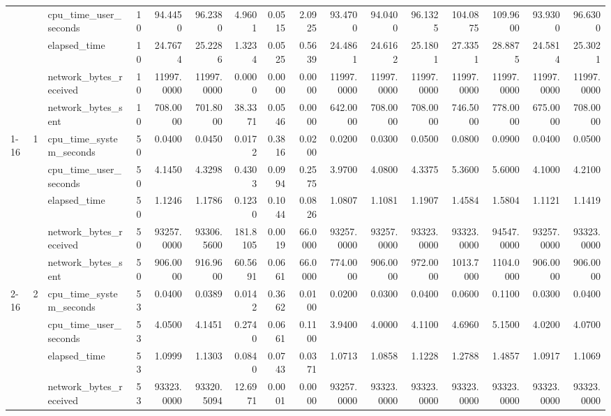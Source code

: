 \begin{tabular}{lllrrrrrrrrrrrrr}
 &  & cpu\_time\_user\_seconds & 10 & 94.4450 & 96.2380 & 4.9601 & 0.0515 & 2.0925 & 93.4700 & 94.0400 & 96.1325 & 104.0875 & 109.9600 & 93.9300 & 96.6300 \\
 &  & elapsed\_time & 10 & 24.7674 & 25.2286 & 1.3234 & 0.0525 & 0.5639 & 24.4861 & 24.6162 & 25.1801 & 27.3351 & 28.8875 & 24.5814 & 25.3021 \\
 &  & network\_bytes\_received & 10 & 11997.0000 & 11997.0000 & 0.0000 & 0.0000 & 0.0000 & 11997.0000 & 11997.0000 & 11997.0000 & 11997.0000 & 11997.0000 & 11997.0000 & 11997.0000 \\
 &  & network\_bytes\_sent & 10 & 708.0000 & 701.8000 & 38.3371 & 0.0546 & 0.0000 & 642.0000 & 708.0000 & 708.0000 & 746.5000 & 778.0000 & 675.0000 & 708.0000 \\
\cline{1-16} \cline{2-16}
\multirow[t]{15}{*}{bbox-filtering-duckdb-small} & \multirow[t]{5}{*}{1} & cpu\_time\_system\_seconds & 50 & 0.0400 & 0.0450 & 0.0172 & 0.3816 & 0.0200 & 0.0200 & 0.0300 & 0.0500 & 0.0800 & 0.0900 & 0.0400 & 0.0500 \\
 &  & cpu\_time\_user\_seconds & 50 & 4.1450 & 4.3298 & 0.4303 & 0.0994 & 0.2575 & 3.9700 & 4.0800 & 4.3375 & 5.3600 & 5.6000 & 4.1000 & 4.2100 \\
 &  & elapsed\_time & 50 & 1.1246 & 1.1786 & 0.1230 & 0.1044 & 0.0826 & 1.0807 & 1.1081 & 1.1907 & 1.4584 & 1.5804 & 1.1121 & 1.1419 \\
 &  & network\_bytes\_received & 50 & 93257.0000 & 93306.5600 & 181.8105 & 0.0019 & 66.0000 & 93257.0000 & 93257.0000 & 93323.0000 & 93323.0000 & 94547.0000 & 93257.0000 & 93323.0000 \\
 &  & network\_bytes\_sent & 50 & 906.0000 & 916.9600 & 60.5691 & 0.0661 & 66.0000 & 774.0000 & 906.0000 & 972.0000 & 1013.7000 & 1104.0000 & 906.0000 & 906.0000 \\
\cline{2-16}
 & \multirow[t]{5}{*}{2} & cpu\_time\_system\_seconds & 53 & 0.0400 & 0.0389 & 0.0142 & 0.3662 & 0.0100 & 0.0200 & 0.0300 & 0.0400 & 0.0600 & 0.1100 & 0.0300 & 0.0400 \\
 &  & cpu\_time\_user\_seconds & 53 & 4.0500 & 4.1451 & 0.2740 & 0.0661 & 0.1100 & 3.9400 & 4.0000 & 4.1100 & 4.6960 & 5.1500 & 4.0200 & 4.0700 \\
 &  & elapsed\_time & 53 & 1.0999 & 1.1303 & 0.0840 & 0.0743 & 0.0371 & 1.0713 & 1.0858 & 1.1228 & 1.2788 & 1.4857 & 1.0917 & 1.1069 \\
 &  & network\_bytes\_received & 53 & 93323.0000 & 93320.5094 & 12.6971 & 0.0001 & 0.0000 & 93257.0000 & 93323.0000 & 93323.0000 & 93323.0000 & 93323.0000 & 93323.0000 & 93323.0000 \\

\end{tabular}
